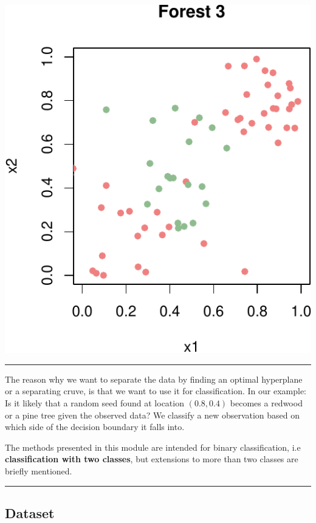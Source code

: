 \documentclass[]{article}
\begin{document}
\includegraphics{9SVM_files/figure-latex/unnamed-chunk-4-1.pdf}

\begin{center}\rule{0.5\linewidth}{\linethickness}\end{center}

The reason why we want to separate the data by finding an optimal
hyperplane or a separating cruve, is that we want to use it for
classification. In our example: Is it likely that a random seed found at
location \((0.8,0.4)\) becomes a redwood or a pine tree given the
observed data? We classify a new observation based on which side of the
decision boundary it falls into.

The methods presented in this module are intended for binary
classification, i.e \textbf{classification with two classes}, but
extensions to more than two classes are briefly mentioned.

\begin{center}\rule{0.5\linewidth}{\linethickness}\end{center}

\hypertarget{dataset}{%
\subsection{Dataset}\label{dataset}}
\end{document}

